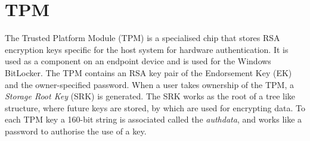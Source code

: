 \section{TPM}
The Trusted Platform Module (TPM) is a specialised chip that stores RSA encryption keys specific for the host system for hardware authentication. It is used as a component on an endpoint device and is used for the Windows BitLocker.
The TPM contains an RSA key pair of the Endorsement Key (EK) and the owner-specified password. When a user takes ownership of the TPM, a \textit{Storage Root Key} (SRK) is generated. The SRK works as the root of a tree like structure, where future keys are stored, by which are used for encrypting data. To each TPM key a 160-bit string is associated called the \textit{authdata}, and works like a password to authorise the use of a key. \\ \\

